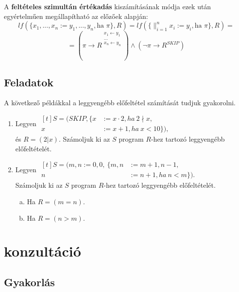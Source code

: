 \documentclass[12pt]{article}
\begin{document}
A \textbf{feltételes szimultán értékadás} kiszámításának módja ezek után egyértelműen megállapítható az előzőek alapján:
$$lf(\{x_1, ..., x_n := y_1, ..., y_n, \text{ha } \pi \}, R) = lf(\{ \mathop{\parallel}_{i=1}^{n} x_i := y_i, \text{ha }\pi \}, R) = $$
$$= (\pi \rightarrow R^{\substack{ x_1 \leftarrow y_1 \\ ... \\ x_n \leftarrow y_n }}) \land (\neg \pi \rightarrow R^{SKIP})$$

\subsection{Feladatok}\label{lf-feladat}
A következő példákkal a leggyengébb előfeltétel számítását tudjuk gyakorolni.

\begin{enumerate}
	\item Legyen $\begin{aligned}[t]
			S = (SKIP, \{x &:= x \cdot 2, ha\ 2 \nmid x,\\
				x &:= x + 1, ha\ x < 10\}),
		\end{aligned}$\\
		és $R = (2 | x)$. Számoljuk ki az $S$ program $R$-hez tartozó leggyengébb előfeltételét.
	\item Legyen $\begin{aligned}[t]
			S = (m,n := 0,0,\ \{m,n &:= m+1, n-1,\\
				n &:= n + 1, ha\ n < m\}).
		\end{aligned}$\\
		Számoljuk ki az $S$ program $R$-hez tartozó leggyengébb előfeltételét.
		\begin{enumerate}[a)]
			\item Ha $R = (m = n).$
			\item Ha $R = (n > m).$
		\end{enumerate}
\end{enumerate}


\section{konzultáció}
\subsection{Gyakorlás}
\end{document}
